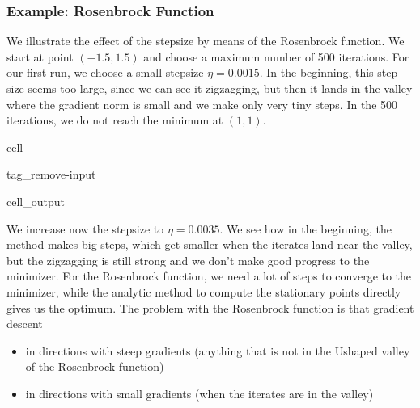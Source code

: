 \documentclass[letterpaper,10pt,english]{jupyterBook}
\begin{document}
\subsubsection{Example: Rosenbrock Function}
\label{\detokenize{optimization_numerical:id1}}
\sphinxAtStartPar
We illustrate the effect of the step\sphinxhyphen{}size by means of the Rosenbrock function. We start at point \((-1.5,1.5)\) and choose a maximum number of 500 iterations. For our first run, we choose a small step\sphinxhyphen{}size \(\eta =0.0015\). In the beginning, this step size seems too large, since we can see it zig\sphinxhyphen{}zagging, but then it lands in the valley where the gradient norm is small and we make only very tiny steps. In the 500 iterations, we do not reach the minimum at \((1,1)\).

\begin{sphinxuseclass}{cell}
\begin{sphinxuseclass}{tag_remove-input}\begin{sphinxVerbatimOutput}

\begin{sphinxuseclass}{cell_output}
\noindent{}

\end{sphinxuseclass}\end{sphinxVerbatimOutput}

\end{sphinxuseclass}
\end{sphinxuseclass}
\sphinxAtStartPar
We increase now the step\sphinxhyphen{}size to \(\eta=0.0035\). We see how in the beginning, the method makes big steps, which get smaller when the iterates land near the valley, but the zig\sphinxhyphen{}zagging is still strong and we don’t make good progress to the minimizer. For the Rosenbrock function, we need a lot of steps to converge to the minimizer, while the analytic method to compute the stationary points directly gives us the optimum.  The problem with the Rosenbrock function is that gradient descent
\begin{itemize}
\item {} 
\sphinxAtStartPar
{} in directions with steep gradients (anything that is not in the U\sphinxhyphen{}shaped valley of the Rosenbrock function)

\item {} 
\sphinxAtStartPar
{} in directions with small gradients (when the iterates are in the valley)

\end{itemize}
\end{document}
